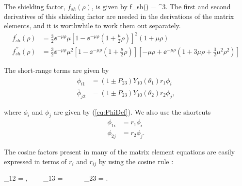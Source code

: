 \documentclass[Dissertation.tex]{subfiles}
\begin{document}
\noindent The shielding factor, $f_{sh}(\rho)$, is given by
\beq
f_{sh}(\rho) = ^3.
\label{eq:PWaveShielding}
\eeq
The first and second derivatives of this shielding factor are needed in the derivations of the matrix elements, and it is worthwhile to work them out separately.
\begin{subequations}
\label{eq:PWaveShieldingDer}
\begin{align}
f_{sh}^\prime(\rho) &= \frac{3}{2} \ee^{-\mu \rho} \mu \left[1 - \ee^{-\mu \rho} \left(1+\frac{\mu}{2}\rho\right)\right]^2 (1 + \mu\rho) \label{eq:PWaveShielding1} \\
f_{sh}^{\prime\prime}(\rho) &= \frac{3}{2} \ee^{-\mu \rho} \mu^2 \left[1 - \ee^{-\mu \rho} \left(1+\frac{\mu}{2}\rho\right)\right] \left[-\mu\rho + \ee^{-\mu \rho} \left(1+3\mu\rho+\frac{3}{2}\mu^2\rho^2\right)\right] \label{eq:PWaveShielding2}
\end{align}
\end{subequations}

\noindent The short-range terms are given by
\begin{subequations}
\label{eq:PWavePhiBar}
\begin{align}
\bar{\phi}_{i1} &= \left(1 \pm P_{23}\right) Y_{10}(\theta_1) r_1 \phi_i \label{eq:PWavePhi1i}\\
\bar{\phi}_{j2} &= \left(1 \pm P_{23}\right) Y_{10}(\theta_2) r_2 \phi_j \label{eq:PWavePhi2j},
\end{align}
\end{subequations}

\noindent where $\phi_i$ and $\phi_j$ are given by (\ref{eq:PhiDef}).  We also use the shortcuts
\begin{subequations}
\label{eq:PWavePhi}
\begin{align}
\phi_{1i} &= r_1 \phi_i \\
\phi_{2j} &= r_2 \phi_j.
\end{align}
\end{subequations}

The cosine factors present in many of the matrix element equations are easily expressed in terms of $r_i$ and $r_{ij}$ by using the cosine rule \cite{?}:

\beq
\label{eq:Cosines}
\cos\theta_{12} = , \ \ \ \ \cos\theta_{13} =  \ \ \   \ \ \cos\theta_{23} = .
\eeq
\end{document}
